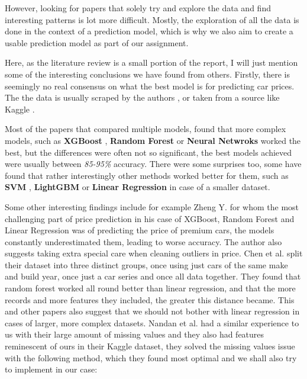 \documentclass[12pt]{article}
\begin{document}
However, looking for papers that solely try and explore the data and find interesting patterns is lot more difficult. Mostly, the exploration of all the data is done in the context of a prediction model, which is why we also aim to create a usable prediction model as part of our assignment.

Here, as the literature review is a small portion of the report, I will just mention some of the interesting conclusions we have found from others. Firstly, there is seemingly no real consensus on what the best model is for predicting car prices. The the data is usually scraped by the authors \cite{gegicCarPricePrediction2019}\cite{bukvicPricePredictionClassification2022}\cite{jinPricePredictionUsed2021}, or taken from a source like Kaggle \cite{zhengMachineLearningOptimization2025}\cite{nandanPreownedCarPrice2023}.

Most of the papers that compared multiple models, found that more complex models, such as \textbf{XGBoost} \cite{nandanPreownedCarPrice2023}, \textbf{Random Forest} \cite{vossResalePricePrediction}\cite{jinPricePredictionUsed2021} or \textbf{Neural Netwroks}\cite{liuResearchPredictionModel2022} worked the best, but the differences were often not so significant, the best models achieved were usually between \textit{85-95\%} accuracy.
There were some surprises too, some have found that rather interestingly other methods worked better for them, such as \textbf{SVM} \cite{shaprapawadCarPricePrediction2023a}, \textbf{LightGBM} \cite{liResearchUsedCar2022} or \textbf{Linear Regression} \cite{bukvicPricePredictionClassification2022} in case of a smaller dataset.

Some other interesting findings include for example Zheng Y. \cite{zhengMachineLearningOptimization2025} for whom the most challenging part of price prediction in his case of XGBoost, Random Forest and Linear Regression was of predicting the price of premium cars, the models constantly underestimated them, leading to worse accuracy. The author also suggests taking extra special care when cleaning outliers in price. 
Chen et al. \cite{chenComparativeAnalysisUsed2017} split their dataset into three distinct groups, once using just cars of the same make and build year, once just a car series and once all data together. They found that random forest worked all round better than linear regression, and that the more records and more features they included, the greater this distance became. This and other papers also suggest that we should not bother with linear regression in cases of larger, more complex datasets.
Nandan et al. \cite{nandanPreownedCarPrice2023} had a similar experience to us with their large amount of missing values and they also had features reminescent of ours in their Kaggle dataset, they solved the missing values issue with the following method, which they found most optimal and we shall also try to implement in our case:
\end{document}
